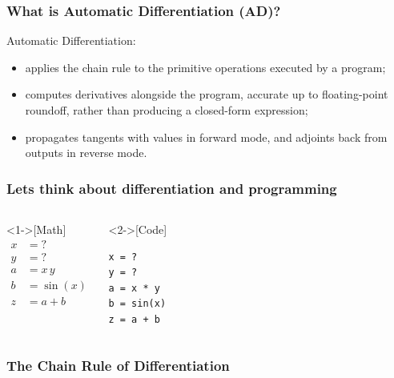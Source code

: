 \documentclass[]{article}
\begin{document}
\begin{frame}
	\frametitle{What is Automatic Differentiation (AD)?}

		Automatic Differentiation:
		\begin{itemize}
			\item applies the chain rule to the primitive operations executed by a program;
			\item computes derivatives alongside the program, accurate up to floating-point roundoff, rather than producing a closed-form expression;
			\item propagates tangents with values in forward mode, and adjoints back from outputs in reverse mode.
		\end{itemize}
\end{frame}

\begin{frame}[fragile]
\frametitle{Lets think about differentiation and programming}
\begin{columns}
    \begin{example}<1->[Math] 
    \vspace{-1.5em}
    \begin{align*}
			x & = ? \\
			y & = ? \\
			a & = x \, y \\
			b & = \sin(x) \\
			z & = a + b
		\end{align*}
    \end{example}

	\begin{example}<2->[Code]
			\begin{lstlisting}
x = ?
y = ?
a = x * y
b = sin(x)
z = a + b
			\end{lstlisting}
	\end{example}
	\end{columns}
\end{frame}

\begin{frame}
\frametitle{The Chain Rule of Differentiation}


\end{frame}
\end{document}
